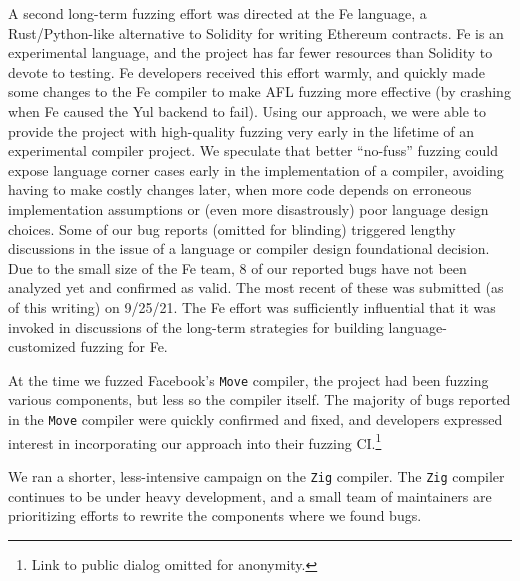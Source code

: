 A second long-term fuzzing effort was directed at the Fe language, a Rust/Python-like alternative to Solidity for writing Ethereum contracts.  Fe is an experimental language, and the project has far fewer resources than Solidity to devote to testing.  Fe developers received this effort warmly, and quickly made some changes to the Fe compiler to make AFL fuzzing more effective (by crashing when Fe caused the Yul backend to fail).  Using our approach, we were able to provide the project with high-quality fuzzing very early in the lifetime of an experimental compiler project.  We speculate that better ``no-fuss'' fuzzing could expose language corner cases early in the implementation of a compiler, avoiding having to make costly changes later, when more code depends on erroneous implementation assumptions or (even more disastrously) poor language design choices.  Some of our bug reports (omitted for blinding) triggered lengthy discussions in the issue of a language or compiler design foundational decision.  Due to the small size of the Fe team, 8 of our reported bugs have not been analyzed yet and confirmed as valid.  The most recent of these was submitted (as of this writing) on 9/25/21.  The Fe effort was sufficiently influential that it was invoked in discussions of the long-term strategies for building language-customized fuzzing for Fe.

At the time we fuzzed Facebook's \texttt{Move} compiler, the project had been fuzzing various components, but less so the compiler itself.
The majority of bugs reported in the \texttt{Move} compiler were quickly confirmed and fixed, and developers expressed interest in incorporating our approach into their fuzzing CI.\footnote{Link to public dialog omitted for anonymity.}  %


We ran a shorter, less-intensive campaign on the \texttt{Zig} compiler.  The
\texttt{Zig} compiler continues to be under heavy development, and a small team
of maintainers are prioritizing efforts to rewrite the components where we found
bugs.
